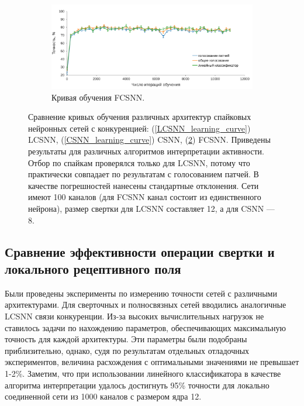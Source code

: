 \documentclass[a4paper]{article}
\begin{document}
\begin{figure}\ContinuedFloat
\begin{subfigure}{0.48\textwidth} 
    \includegraphics[width=\textwidth,keepaspectratio=true]{FCSNN_learning_rate_ru.pdf}
 \caption{Кривая обучения FCSNN.}
 \label{FCSNN_learning_curve}
\end{subfigure}
\caption{Сравнение кривых обучения различных архитектур спайковых нейронных сетей с конкуренцией: (\ref{LCSNN_learning_curve}) LCSNN, (\ref{CSNN_learning_curve}) CSNN, (\ref{FCSNN_learning_curve}) FCSNN. Приведены результаты для различных алгоритмов интерпретации активности. Отбор по спайкам проверялся только для LCSNN, потому что практически совпадает по результатам с голосованием патчей. В качестве погрешностей нанесены стандартные отклонения. Сети имеют 100 каналов (для FCSNN канал состоит из единственного нейрона), размер свертки для LCSNN составляет 12, а для CSNN --- 8.}
\end{figure}

\subsection{Сравнение эффективности операции свертки и локального рецептивного поля}
Были проведены эксперименты по измерению точности сетей с различными архитектурами. Для сверточных и полносвязных сетей вводились аналогичные LCSNN связи конкуренции. Из-за высоких вычислительных нагрузок не ставилось задачи по нахождению параметров, обеспечивающих максимальную точность для каждой архитектуры. Эти параметры были подобраны приблизительно, однако, судя по результатам отдельных отладочных экспериментов, величина расхождения с оптимальными значениями не превышает 1-2\%. Заметим, что при использовании линейного классификатора в качестве алгоритма интерпретации удалось достигнуть 95\% точности для локально соединенной сети из 1000 каналов с размером ядра 12.
\end{document}
